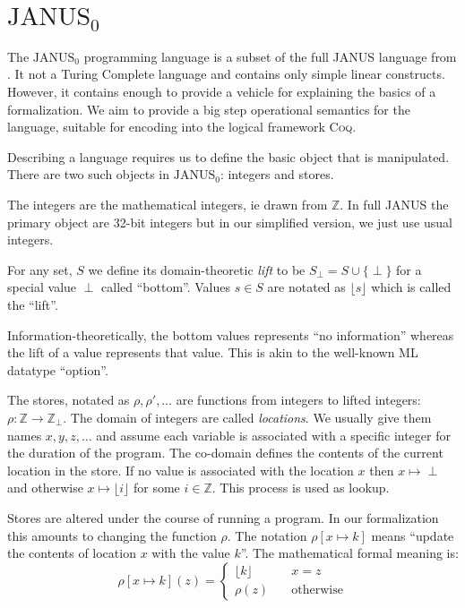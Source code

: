 \newcommand{\janusz}{$\mathrm{JANUS}_0$}
\newcommand{\coq}{\textsc{Coq}}
\newcommand{\ZZ}{\mathbb{Z}}
\chapter{\janusz{}}

The \janusz{} programming language is a subset of the full JANUS
language from \cite{glueck2007}. It not a Turing Complete language and
contains only simple linear constructs. However, it contains enough to
provide a vehicle for explaining the basics of a formalization. We aim
to provide a big step operational semantics for the language, suitable
for encoding into the logical framework \coq{}.

Describing a language requires us to define the basic object that is
manipulated. There are two such objects in \janusz{}: integers and
stores.

The integers are the mathematical integers, ie drawn from $\ZZ$. In
full JANUS the primary object are 32-bit integers but in our
simplified version, we just use usual integers.

\newcommand{\lift}[1]{\lfloor #1 \rfloor}
\begin{defn}
  For any set, $S$ we define its domain-theoretic \emph{lift} to be
  $S_{\perp} = S \cup \{\perp\} $ for a special value $\perp$ called
  ``bottom''. Values $s \in S$ are notated as $\lift{s}$ which is
  called the ``lift''.
\end{defn}
Information-theoretically, the bottom values represents ``no
information'' whereas the lift of a value represents that value. This
is akin to the well-known ML datatype ``option''.

The stores, notated as $\rho, \rho', \dotsc$ are functions from
integers to lifted integers: $\rho \colon \ZZ \to \ZZ_{\perp}$. The
domain of integers are called \emph{locations}. We usually give them
names $x, y, z, \dotsc$ and assume each variable is associated with a
specific integer for the duration of the program. The co-domain
defines the contents of the current location in the store. If no value
is associated with the location $x$ then $x \mapsto \perp$ and
otherwise $x \mapsto \lift{i}$ for some $i \in \ZZ$. This process is
used as lookup.

Stores are altered under the course of running a program. In our
formalization this amounts to changing the function
$\rho$. The notation $\rho[x \mapsto k]$ means ``update the contents
of location $x$ with the value $k$''. The mathematical formal meaning
is:
\begin{equation*}
  \rho[x \mapsto k](z) = \begin{cases}
    \lift{k} & \quad x = z\\
    \rho(z)  & \quad \text{otherwise}
  \end{cases}
\end{equation*}

